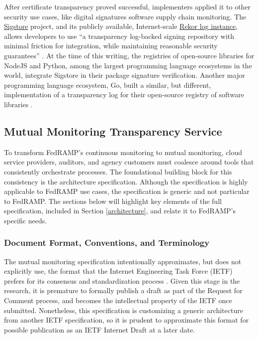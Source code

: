 \documentclass{jdf}
\begin{document}
After certificate transparency proved successful, implementers applied it to other security use cases, like digital signatures software supply chain monitoring. The \href{https://sigstore.dev}{Sigstore} project, and its publicly available, Internet-scale \href{https://rekor.sigstore.dev/}{Rekor log instance}, allows developers to use ``a transparency log-backed signing repository with minimal friction for integration, while maintaining reasonable security guarantees'' \cite[p.~2365]{newman22}. At the time of this writing, the registries of open-source libraries for NodeJS and Python, among the largest programming language ecosystems in the world, integrate Sigstore in their package signature verification. Another major programming language ecosystem, Go, built a similar, but different, implementation of a transparency log for their open-source registry of software libraries \cite{hockman19}.

\subsection{Mutual Monitoring Transparency Service}

To transform FedRAMP's continuous monitoring to mutual monitoring, cloud service providers, auditors, and agency customers must coalesce around tools that consistently orchestrate processes. The foundational building block for this consistency is the architecture specification. Although the specification is highly applicable to FedRAMP use cases, the specification is generic and not particular to FedRAMP. The sections below will highlight key elements of the full specification, included in Section \ref{architecture}, and relate it to FedRAMP's specific needs.

\subsubsection{Document Format, Conventions, and Terminology}

The mutual monitoring specification intentionally approximates, but does not explicitly use, the format that the Internet Engineering Task Force (IETF) prefers for its consensus and standardization process \citeyear{ietf_authors_format}. Given this stage in the research, it is premature to formally publish a draft as part of the Request for Comment process, and becomes the intellectual property of the IETF once submitted. Nonetheless, this specification is customizing a generic architecture from another IETF specification, so it is prudent to approximate this format for possible publication as an IETF Internet Draft at a later date. 
\end{document}
